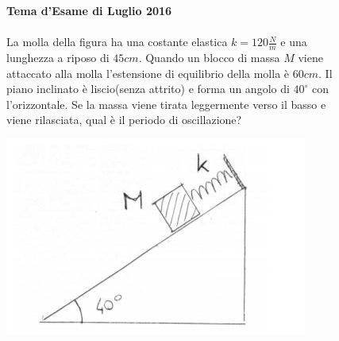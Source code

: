     \begin{figure}[h!]
    \textbf{Tema d'Esame di Luglio 2016}\\ \\
    La molla della figura ha una costante elastica $k = 120 \frac{N}{m}$ e una lunghezza a riposo di $45cm$. Quando un blocco di massa $M$ viene attaccato alla molla l'estensione di equilibrio della molla è $60cm$. Il piano inclinato è liscio(senza attrito) e forma un angolo di $40^\circ$ con l'orizzontale. Se la massa viene tirata leggermente verso il basso e viene rilasciata, qual è il periodo di oscillazione? 
    \\
        \begin{center}
            \includegraphics[scale=0.5]{ES2/LUG022016.jpg}
        \end{center}
    \end{figure}
    
    